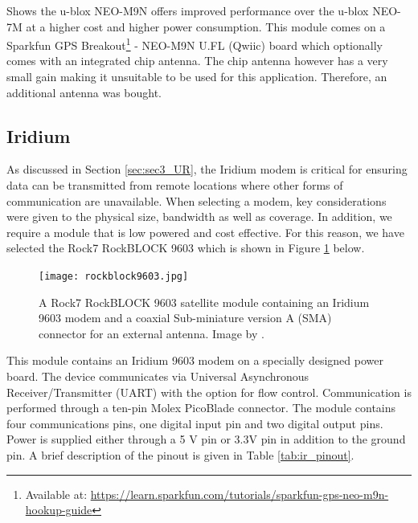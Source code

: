 Shows the u-blox NEO-M9N offers improved performance  over the u-blox NEO-7M at a higher cost and higher power consumption. This module comes on a Sparkfun GPS Breakout\footnote{Available at: \url{https://learn.sparkfun.com/tutorials/sparkfun-gps-neo-m9n-hookup-guide}} - NEO-M9N U.FL (Qwiic) board which optionally comes with an integrated chip antenna. The chip antenna however has a very small gain making it unsuitable to be used for this application. Therefore, an additional antenna was bought. 

\subsection{Iridium}

As discussed in Section \ref{sec:sec3_UR}, the Iridium modem is critical for ensuring data can be transmitted from remote locations where other forms of communication are unavailable. When selecting a modem, key considerations were given to the physical size, bandwidth as well as coverage. In addition, we require a module that is low powered and cost effective. For this reason, we have selected the Rock7 RockBLOCK 9603\cite{rockblock2019image} which is shown in Figure \ref{fig:rockblock} below.

\begin{figure}[H]
	\centering
	\texttt{[image: rockblock9603.jpg]}
	\caption{A Rock7 RockBLOCK 9603 satellite module containing an Iridium 9603 modem \cite{9603} and a coaxial Sub-miniature version A (SMA) connector for an external antenna. Image by \textcite{rockblock2019image}.}
	\label{fig:rockblock}
\end{figure}

This module contains an Iridium 9603 modem on a specially designed power board. The device communicates via Universal Asynchronous Receiver/Transmitter (UART) with the option for flow control. Communication is performed through a ten-pin Molex PicoBlade connector. The module contains four communications pins, one digital input pin and two digital output pins. Power is supplied either through a 5 V pin or 3.3V pin in addition to the ground pin. A brief description of the pinout is given in Table \ref{tab:ir_pinout}. 

